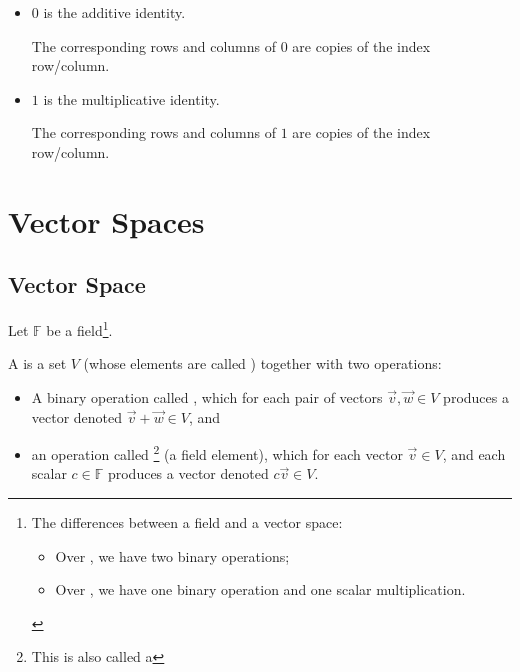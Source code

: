 \documentclass[11pt,fleqn]{book} %
\begin{document}
\begin{example}
\begin{itemize}
\begin{itemize}
            \item $0$ is the additive identity.

            The corresponding rows and columns of $0$ are copies of the index row/column.

            \item $1$ is the multiplicative identity.

            The corresponding rows and columns of $1$ are copies of the index row/column.
        \end{itemize}
    \end{itemize}
\end{example}

\section{Vector Spaces}

\subsection{Vector Space}

Let $\mathbb{F}$ be a field\footnote{The differences between a field and a vector space: \begin{itemize} \item Over , we have two binary operations; \item Over , we have one binary operation and one scalar multiplication. \end{itemize}}.

\setcounter{chapter}{5}
\setcounter{section}{2}
\begin{definition}
    A  is a set $V$ (whose elements are called ) together with two operations:
    \begin{itemize}
        \item A binary operation called , which for each pair of vectors $\vec{v}, \vec{w} \in V$ produces a vector denoted $\vec{v} + \vec{w} \in V$, and

        \item an operation called \footnote{This is also called a } (a field element), which for each vector $\vec{v} \in V$, and each scalar $c \in \mathbb{F}$ produces a vector denoted $c\vec{v}\in V$.
    \end{itemize}
\end{definition}
\setcounter{section}{3}
\setcounter{chapter}{1}
\end{document}
